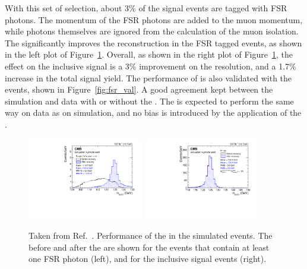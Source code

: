With this set of selection, about 3\% of the signal events are tagged with FSR photons.
The momentum of the FSR photons are added to the muon momentum, 
while photons themselves are ignored from the calculation of the muon isolation.
The \FSR significantly improves the \mmm reconstruction in the FSR tagged events, as shown in the left plot of Figure~\ref{fig:fsr_sig}.
Overall, as shown in the right plot of Figure~\ref{fig:fsr_sig}, the effect on the inclusive signal is a 3\% improvement on the \mmm resolution, 
and a 1.7\% increase in the total signal yield. 
The performance of \FSR is also validated with the \zmm events, shown in Figure~\ref{fig:fsr_val}.
A good agreement kept between the simulation and data with or without the \FSR. 
The \FSR is expected to perform the same way on data as on simulation, 
and no bias is introduced by the application of the \FSR. 

\begin{figure}[!htb]
      \centering
      \captionsetup{justification=justified}
      \includegraphics[width=0.45\textwidth]{pics/muon_corr/FSR/FSRrecovery_FSRtagged.pdf}
      \includegraphics[width=0.45\textwidth]{pics/muon_corr/FSR/FSRrecovery_FullSignal.pdf}
      \caption{Taken from Ref.~\cite{}. 
               Performance of the \FSR in the simulated \hmm events. 
               The \mmm before and after the \FSR are shown for the events that contain at least one FSR photon (left),
               and for the inclusive signal events (right).}
      \label{fig:fsr_sig}
\end{figure}

